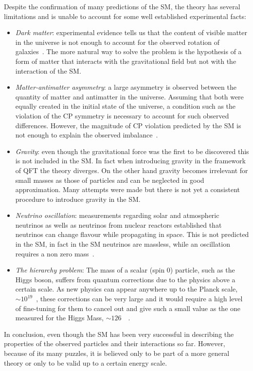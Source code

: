 Despite the confirmation of many predictions of the SM, the theory has several limitations
and is unable to account for some well established experimental facts:
%
\begin{itemize}
\item \emph{Dark matter}: experimental evidence tells us that the content of visible matter in the universe is not enough
to account for the observed rotation of galaxies~\cite{Zwicky:1933gu}. The more natural way to solve the problem
is the hypothesis of a form of matter that interacts with the gravitational field but not with the interaction of the SM. 
%
\item \emph{Matter-antimatter asymmetry}: a large asymmetry is observed between the quantity of matter and antimatter
in the universe. Assuming that both were equally created in the initial state of the universe, a condition such
as the violation of the CP symmetry is necessary to account for such observed differences. However, the magnitude of
CP violation predicted by the SM is not enough to explain the observed imbalance~\cite{Gavela:1993ts}.
%
\item \emph{Gravity}: even though the gravitational force was the first to be discovered this is not included in the SM.
In fact when introducing gravity in the framework of QFT the theory diverges. On the other hand
gravity becomes irrelevant for small masses as those of particles and can be neglected in good approximation.
Many attempts were made but there is not yet a consistent procedure to introduce gravity in the SM. 
%
\item \emph{Neutrino oscillation}: measurements regarding solar and atmospheric neutrinos as wells as
neutrinos from nuclear reactors established that neutrinos can change flavour while propagating in space.
This is not predicted in the SM, in fact in the SM neutrinos are massless, while an oscillation requires a non
zero mass~\cite{Maltoni:2011zz}.
%
\item \emph{The hierarchy problem}: The mass of a scalar (spin 0) particle, such as the Higgs boson,
suffers from quantum corrections due to the physics above a certain scale. As new physics can appear
anywhere up to the Planck scale, $\sim 10^{19}$~\gev, these corrections can be very large and it would require
a high level of fine-tuning for them to cancel out and give such a small value as the one measured for the
Higgs Mass,  $\sim 126$~\gevcc~\cite{Feng:2013pwa}. 
%
\end{itemize}
%
In conclusion, even though the SM has been very successful in describing the properties of the observed particles
and their interactions so far. However, because of its many puzzles, it is believed only to be part of a more general theory 
or only to be valid up to a certain energy scale. %


